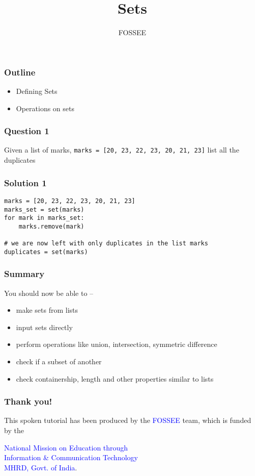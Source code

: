 \documentclass[presentation]{beamer}
\title{Sets}
\author{FOSSEE}
\date{}
\begin{document}
\maketitle









\begin{frame}
\frametitle{Outline}
\label{sec-1}

\begin{itemize}
\item Defining Sets
\item Operations on sets
\end{itemize}
\end{frame}
\begin{frame}
\frametitle{Question 1}
\label{sec-2}

  Given a list of marks, \texttt{marks = [20, 23, 22, 23, 20, 21, 23]} list
  all the duplicates
\end{frame}
\begin{frame}[fragile]
\frametitle{Solution 1}
\label{sec-3}

\lstset{language=Python}
\begin{lstlisting}
marks = [20, 23, 22, 23, 20, 21, 23] 
marks_set = set(marks)
for mark in marks_set:
    marks.remove(mark)

# we are now left with only duplicates in the list marks
duplicates = set(marks)
\end{lstlisting}
\end{frame}
\begin{frame}
\frametitle{Summary}
\label{sec-4}

  You should now be able to --
\begin{itemize}
\item make sets from lists
\item input sets directly
\item perform operations like union, intersection, symmetric difference
\item check if a subset of another
\item check containership, length and other properties similar to lists
\end{itemize}
\end{frame}
\begin{frame}
\frametitle{Thank you!}
\label{sec-5}

  \begin{block}{}
  \begin{center}
  This spoken tutorial has been produced by the
  \textcolor{blue}{FOSSEE} team, which is funded by the 
  \end{center}
  \begin{center}
    \textcolor{blue}{National Mission on Education through \\
      Information \& Communication Technology \\ 
      MHRD, Govt. of India}.
  \end{center}  
  \end{block}
\end{frame}
\end{document}
